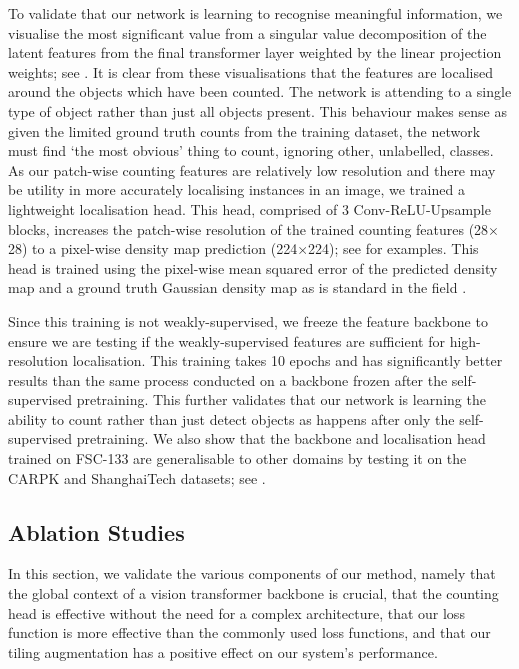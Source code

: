 \documentclass[../thesis.tex]{subfiles}
\begin{document}
To validate that our network is learning to recognise meaningful information, we visualise the most significant value from a singular value decomposition of the latent features from the final transformer layer weighted by the linear projection weights; see .
It is clear from these visualisations that the features are localised around the objects which have been counted. The network is attending to a single type of object rather than just all objects present.
This behaviour makes sense as given the limited ground truth counts from the training dataset, the network must find `the most obvious' thing to count, ignoring other, unlabelled, classes.
As our patch-wise counting features are relatively low resolution and there may be utility in more accurately localising instances in an image, we trained a lightweight localisation head. This head, comprised of 3 Conv-ReLU-Upsample blocks, increases the patch-wise resolution of the trained counting features (28$\times$28) to a pixel-wise density map prediction (224$\times$224); see  for examples. This head is trained using the pixel-wise mean squared error of the predicted density map and a ground truth Gaussian density map as is standard in the field \cite{ranjan2021Famnet, shi2022represent}. 

Since this training is not weakly-supervised, we freeze the feature backbone to ensure we are testing if the weakly-supervised features are sufficient for high-resolution localisation. 
This training takes 10 epochs and has significantly better results than the same process conducted on a backbone frozen after the self-supervised pretraining. 
This further validates that our network is learning the ability to count rather than just detect objects as happens after only the self-supervised pretraining. 
We also show that the backbone and localisation head trained on FSC-133 are generalisable to other domains by testing it on the CARPK and ShanghaiTech \cite{zhang2016single} datasets; see .

\subsection{Ablation Studies}
\label{LTCA__sec__results_ablationstudies}

In this section, we validate the various components of our method, namely that the global context of a vision transformer
backbone is crucial, that the counting head is effective without the need for a complex architecture, that our loss function is more effective than the commonly used loss functions, 
and that our tiling augmentation has a positive effect on our system's performance.
\end{document}
